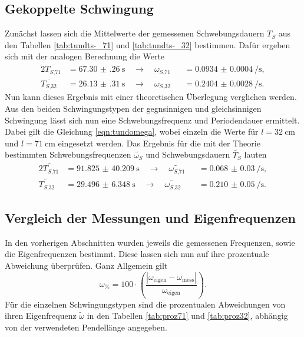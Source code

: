 \subsection{Gekoppelte Schwingung}
Zunächst lassen sich die Mittelwerte der gemessenen Schwebungsdauern $T_{S}$ aus den Tabellen \ref{tab:tundts-_71} und \ref{tab:tundts-_32} bestimmen.
Dafür ergeben sich mit der analogen Berechnung die Werte
\begin{alignat*}{2}
    \overline{T_{S\text{,}71}} &= \SI{67.30(26)}{\second} \quad \to \quad \omega_{S\text{,}71} &&= \SI{0.0934(4)}{\per\second}, \\
    \overline{T_{S\text{,}32}} &= \SI{26.13(31)}{\second}\quad \to \quad \omega_{S\text{,}32} &&= \SI{0.2404(28)}{\per\second}. 
\end{alignat*}
Nun kann dieses Ergebnis mit einer theoretischen Überlegung verglichen werden. Aus den beiden Schwingungstypen der gegnsinnigen und gleichsinnigen Schwingung lässt sich nun eine
Schwebungsfrequenz und Periodendauer ermittelt. Dabei gilt die Gleichung \eqref{eqn:tundomega}, wobei einzeln die Werte für $l = \SI{32}{\centi\meter}$ und $l = \SI{71}{\centi\meter}$ eingesetzt werden. Das Ergebnis für die mit
der Theorie bestimmten Schwebungsfrequenzen $\tilde{\omega_{S}}$ und Schwebungsdauern $\tilde{T_{S}}$ lauten
\begin{alignat*}{2}
    \widetilde{T_{S\text{,}71}} &= \SI{91.825(40209)}{\second} \quad \to \quad \widetilde{\omega_{S\text{,}71}} &&= \SI{0.068(30)}{\per\second}, \\
    \widetilde{T_{S\text{,}32}} &= \SI{29.496(6348)}{\second}\quad \to \quad \widetilde{\omega_{S\text{,}32}} &&= \SI{0.210(50)}{\per\second}. 
\end{alignat*}

\subsection{Vergleich der Messungen und Eigenfrequenzen}
In den vorherigen Abschnitten wurden jeweils die gemessenen Frequenzen, sowie die Eigenfrequenzen bestimmt. Diese lassen sich nun auf ihre prozentuale Abweichung überprüfen. 
Ganz Allgemein gilt
\begin{equation}
        \label{eqn:lol}
    \omega_{\si{\percent}} = 100 \cdot \left( \frac{|\omega_{\text{eigen}} - \omega_{\text{mess}}|}{\omega_{\text{eigen}}} \right).
\end{equation}
Für die einzelnen Schwingungstypen sind die prozentualen Abweichungen von ihren Eigenfrequenz $\tilde{\omega}$ in den Tabellen \ref{tab:proz71} und \ref{tab:proz32}, abhängig von der verwendeten Pendellänge angegeben.

